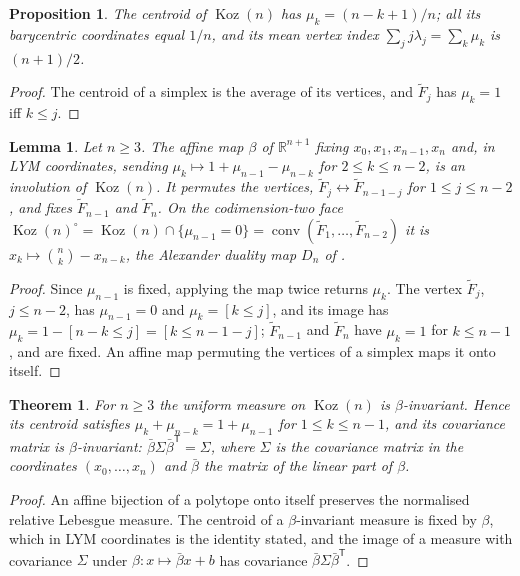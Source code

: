 \documentclass[11pt, a4paper, abstract=yes]{scrartcl}
\theoremstyle{definition}
\theoremstyle{remark}
\theoremstyle{plain}
\newtheorem{lemma}[definition]{Lemma}
\newtheorem{proposition}[definition]{Proposition}
\newtheorem{theorem}[definition]{Theorem}
\theoremstyle{remark}
\theoremstyle{plain}
\newcommand{\Koz}{\operatorname{Koz}}
\newcommand{\conv}{\operatorname{conv}}
\newcommand{\leandiscof}[1]{\tikz[baseline=-0.6ex]\fill[#1] (0,0) circle (0.6ex);}
\newcommand{\leanfull}{\leandiscof{leanfull}}
\newcommand{\leanmark}[1]{\leavevmode{\reversemarginpar\marginnote{\raggedleft#1}}}
\begin{document}
\begin{proposition}
\leanmark{\leanfull}The centroid of \(\Koz(n)\) has \(\mu_k=(n-k+1)/n\); all its barycentric coordinates equal \(1/n\),
and its mean vertex index \(\sum_jj\lambda_j=\sum_k\mu_k\) is \((n+1)/2\).
\label{prop-centroid-simplex}
\end{proposition}

\begin{proof}
The centroid of a simplex is the average of its vertices, and \(\tilde F_j\) has \(\mu_k=1\) iff
\(k\le j\).
\end{proof}

\begin{lemma}
\leanmark{\leanfull}Let \(n\ge3\). The affine map \(\beta\) of \(\mathbb R^{n+1}\) fixing \(x_0,x_1,x_{n-1},x_n\) and, in LYM
coordinates, sending \(\mu_k\mapsto1+\mu_{n-1}-\mu_{n-k}\) for \(2\le k\le n-2\), is an involution of
\(\Koz(n)\). It permutes the vertices, \(\tilde F_j\leftrightarrow\tilde F_{n-1-j}\) for
\(1\le j\le n-2\), and fixes \(\tilde F_{n-1}\) and \(\tilde F_n\). On the codimension-two face
\(\Koz(n)^\circ=\Koz(n)\cap\lbrace\mu_{n-1}=0\rbrace=\conv(\tilde F_1,\dots,\tilde F_{n-2})\) it is
\(x_k\mapsto\binom nk-x_{n-k}\), the Alexander duality map \(D_n\) of \autocite[Definition 13]{SnellmanArticle2}.
\label{lem-beta}
\end{lemma}

\begin{proof}
Since \(\mu_{n-1}\) is fixed, applying the map twice returns \(\mu_k\). The vertex \(\tilde F_j\),
\(j\le n-2\), has \(\mu_{n-1}=0\) and \(\mu_k=[k\le j]\), and its image has
\(\mu_k=1-[n-k\le j]=[k\le n-1-j]\); \(\tilde F_{n-1}\) and \(\tilde F_n\) have \(\mu_k=1\) for
\(k\le n-1\), and are fixed. An affine map permuting the vertices of a simplex maps it onto itself.
\end{proof}

\begin{theorem}
\leanmark{\leanfull}For \(n\ge3\) the uniform measure on \(\Koz(n)\) is \(\beta\)-invariant. Hence its centroid satisfies
\(\mu_k+\mu_{n-k}=1+\mu_{n-1}\) for \(1\le k\le n-1\), and its covariance matrix is \(\beta\)-invariant:
\(\bar\beta\Sigma\bar\beta^{\mathsf T}=\Sigma\), where \(\Sigma\) is the covariance matrix in the coordinates
\((x_0,\dots,x_n)\) and \(\bar\beta\) the matrix of the linear part of \(\beta\).
\label{thm-beta-continuous}
\end{theorem}

\begin{proof}
An affine bijection of a polytope onto itself preserves the normalised relative Lebesgue measure.
The centroid of a \(\beta\)-invariant measure is fixed by \(\beta\), which in LYM coordinates is the
identity stated, and the image of a measure with covariance \(\Sigma\) under \(\beta:x\mapsto\bar\beta x+b\) has
covariance \(\bar\beta\Sigma\bar\beta^{\mathsf T}\).
\end{proof}
\end{document}
